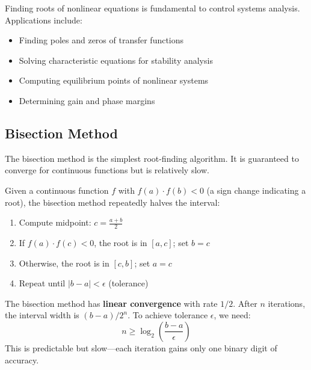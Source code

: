 Finding roots of nonlinear equations is fundamental to control systems analysis. Applications include:
\begin{itemize}
    \item Finding poles and zeros of transfer functions
    \item Solving characteristic equations for stability analysis
    \item Computing equilibrium points of nonlinear systems
    \item Determining gain and phase margins
\end{itemize}



\subsection{Bisection Method}

The bisection method is the simplest root-finding algorithm. It is guaranteed to converge for continuous functions but is relatively slow.

\begin{definitionbox}[title=Definition 11.4: Bisection Method]
Given a continuous function $f$ with $f(a) \cdot f(b) < 0$ (a sign change indicating a root), the bisection method repeatedly halves the interval:
\begin{enumerate}
    \item Compute midpoint: $c = \frac{a + b}{2}$
    \item If $f(a) \cdot f(c) < 0$, the root is in $[a, c]$; set $b = c$
    \item Otherwise, the root is in $[c, b]$; set $a = c$
    \item Repeat until $|b - a| < \epsilon$ (tolerance)
\end{enumerate}
\end{definitionbox}

\begin{keyconceptbox}[title=Bisection Convergence]
The bisection method has \textbf{linear convergence} with rate $1/2$. After $n$ iterations, the interval width is $(b-a)/2^n$. To achieve tolerance $\epsilon$, we need:
\begin{equation}
n \geq \log_2\left(\frac{b-a}{\epsilon}\right)
\end{equation}
This is predictable but slow---each iteration gains only one binary digit of accuracy.
\end{keyconceptbox}

